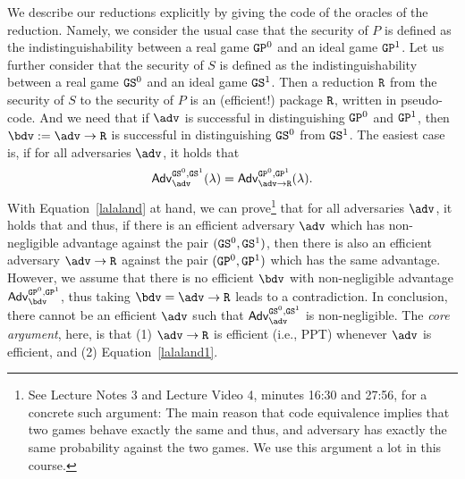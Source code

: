 We describe our reductions explicitly by giving the code of the oracles of the reduction. Namely, we consider the usual case that the security of $P$ is defined as the indistinguishability between a real game $\text{\texttt{GP}}^0$
and an ideal game $\text{\texttt{GP}}^1$. Let us further consider that the security of $S$ is defined as the indistinguishability between
a real game $\text{\texttt{GS}}^0$ and an ideal game $\text{\texttt{GS}}^1$. Then a reduction $\text{\texttt{R}}$ from the security of $S$ to the security of $P$
is an (efficient!) package $\text{\texttt{R}}$, written in pseudo-code. And we need that if $\adv$ is successful in distinguishing $\text{\texttt{GP}}^0$ and
$\text{\texttt{GP}}^1$, then $\bdv:=\adv\rightarrow\M{R}$ is successful in distinguishing $\text{\texttt{GS}}^0$ from $\text{\texttt{GS}}^1$. The easiest case is,
if for all adversaries $\adv$, it holds that
\begin{equation}\label{lalaland1}
      \mathsf{Adv}^{\M{GS}^0,\M{GS}^1}_\adv(\lambda)=\mathsf{Adv}^{\M{GP}^0,\M{GP}^1}_{\adv\rightarrow\M{R}}(\lambda).
\end{equation}
With Equation~\ref{lalaland} at hand, we can prove\footnote{See Lecture Notes 3 and Lecture Video 4, minutes 16:30 and 27:56, for a concrete such argument: The main reason that code equivalence implies that two games behave exactly the same and thus, and adversary has exactly the same probability against the two games. We use this argument a lot in this course.}  that for all adversaries $\adv$, it holds that
and thus, if there is an efficient adversary $\adv$ which has non-negligible advantage against the pair $(\text{\texttt{GS}}^0,\text{\texttt{GS}}^1)$,
then there is also an efficient adversary $\adv\rightarrow\M{R}$ against the pair $(\text{\texttt{GP}}^0,\text{\texttt{GP}}^1)$ which has the same
advantage. However, we assume that there is no efficient $\bdv$ with non-negligible advantage $\mathsf{Adv}^{\M{GP}^0,\M{GP}^1}_{\bdv}$, thus taking $\bdv=\adv\rightarrow\M{R}$ leads to a contradiction. In conclusion, there cannot be an efficient $\adv$ such that $\mathsf{Adv}^{\M{GS}^0,\M{GS}^1}_\adv$ is non-negligible. The \emph{core argument}, here, is that (1) $\adv\rightarrow\M{R}$ is efficient (i.e., PPT) whenever $\adv$ is efficient, and (2) Equation~\ref{lalaland1}.

